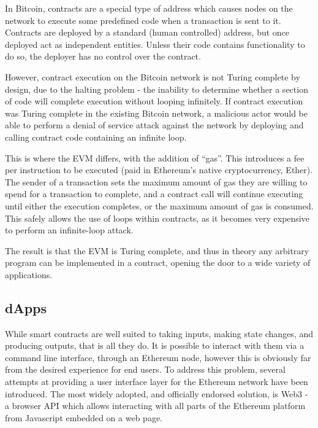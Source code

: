 In Bitcoin, contracts are a special type of address which causes nodes on the network to execute some predefined code when a transaction is sent to it. Contracts are deployed by a standard (human controlled) address, but once deployed act as independent entities. Unless their code contains functionality to do so, the deployer has no control over the contract.

However, contract execution on the Bitcoin network is not Turing complete by design, due to the halting problem - the inability to determine whether a section of code will complete execution without looping infinitely. If contract execution was Turing complete in the existing Bitcoin network, a malicious actor would be able to perform a denial of service attack against the network by deploying and calling contract code containing an infinite loop.

This is where the EVM differs, with the addition of “gas”. This introduces a fee per instruction to be executed (paid in Ethereum’s native cryptocurrency, Ether). The sender of a transaction sets the maximum amount of gas they are willing to spend for a transaction to complete, and a contract call will continue executing until either the execution completes, or the maximum amount of gas is consumed. This safely allows the use of loops within contracts, as it becomes very expensive to perform an infinite-loop attack.

The result is that the EVM is Turing complete, and thus in theory any arbitrary program can be implemented in a contract, opening the door to a wide variety of applications.

\subsection{dApps}

While smart contracts are well suited to taking inputs, making state changes, and producing outputs, that is all they do. It is possible to interact with them via a command line interface, through an Ethereum node, however this is obviously far from the desired experience for end users. To address this problem, several attempts at providing a user interface layer for the Ethereum network have been introduced. The most widely adopted, and officially endorsed solution\cite{Web3Endorsement}, is Web3 - a browser API which allows interacting with all parts of the Ethereum platform from Javascript embedded on a web page.

